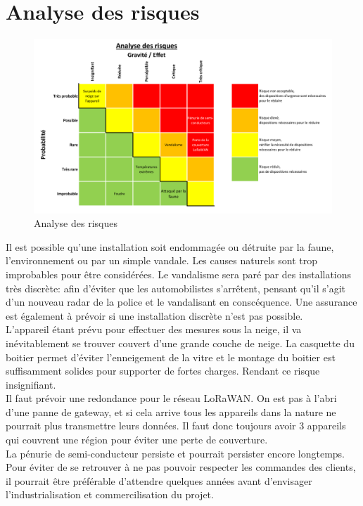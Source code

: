 \section{Analyse des risques}
\begin{figure}[H]
    \centering
    \includegraphics[width=\linewidth]{Images/business/risiko.PNG}
    \caption[]{Analyse des risques}
    \label{fig:risiko}
\end{figure}

Il est possible qu'une installation soit endommagée ou détruite par la faune, l'environnement
ou par un simple vandale. Les causes naturels sont trop improbables pour être considérées.
Le vandalisme sera paré par des installations très discrète: afin d'éviter que les automobilistes
s'arrêtent, pensant qu'il s'agit d'un nouveau radar de la police et le vandalisant en conscéquence.
Une assurance est également à prévoir si une installation discrète n'est pas possible.\\[0.2cm]
L'appareil étant prévu pour effectuer des mesures sous la neige, il va inévitablement se trouver couvert
d'une grande couche de neige. La casquette du boitier permet d'éviter l'enneigement de la vitre et
le montage du boitier est suffisamment solides pour supporter de fortes charges. Rendant ce risque insignifiant.\\[0.2cm]
Il faut prévoir une redondance pour le réseau LoRaWAN. On est pas à l'abri d'une panne de gateway, et si cela arrive
tous les appareils dans la nature ne pourrait plus transmettre leurs données. Il faut donc toujours avoir 3 appareils
qui couvrent une région pour éviter une perte de couverture.\\[0.2cm]
La pénurie de semi-conducteur persiste et pourrait persister encore longtemps. Pour éviter de se retrouver à
ne pas pouvoir respecter les commandes des clients, il pourrait être préférable d'attendre quelques années avant
d'envisager l'industrialisation et commercilisation du projet.